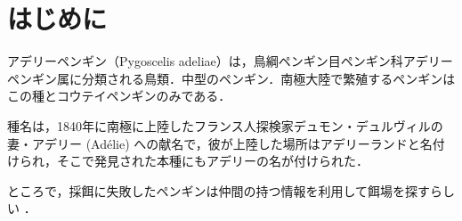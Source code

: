 \chapter{はじめに}
\thispagestyle{myheadings}

アデリーペンギン（Pygoscelis adeliae）は，鳥綱ペンギン目ペンギン科アデリーペンギン属に分類される鳥類．中型のペンギン．南極大陸で繁殖するペンギンはこの種とコウテイペンギンのみである．

種名は，1840年に南極に上陸したフランス人探検家デュモン・デュルヴィルの妻・アデリー (Adélie) への献名で，彼が上陸した場所はアデリーランドと名付けられ，そこで発見された本種にもアデリーの名が付けられた．

ところで，採餌に失敗したペンギンは仲間の持つ情報を利用して餌場を探すらしい \cite{採餌に失敗したペンギンは仲間の持つ情報を利用して餌場を探す}．

